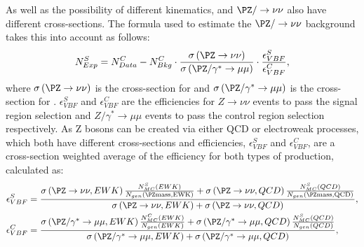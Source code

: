 As well as the possibility of different kinematics, \Zmumu and $\PZ/\rightarrow\nu\nu$ also have different cross-sections. The formula used to estimate the $\PZ/\rightarrow\nu\nu$ background takes this into account as follows:
\begin{equation}
  \label{eq:zdatabkg}
  N^{S}_{Exp}=N^{C}_{Data}-N^{C}_{Bkg}\cdot\frac{\sigma\left(\PZ\rightarrow\nu\nu\right)}{\sigma\left(\PZ/\gamma^{*}\rightarrow\mu\mu\right)}\cdot\frac{\epsilon^{S}_{VBF}}{\epsilon^{C}_{VBF}},
\end{equation}
where $\sigma\left(\PZ\rightarrow\nu\nu\right)$ is the cross-section for \Znunu and $\sigma\left(\PZ/\gamma^{*}\rightarrow\mu\mu\right)$ is the cross-section for \Zmumu. $\epsilon^{S}_{VBF}$ and $\epsilon^{C}_{VBF}$ are the efficiencies for $Z\rightarrow\nu\nu$ events to pass the signal region selection and $Z/\gamma^{*}\rightarrow\mu\mu$ events to pass the control region selection respectively. As Z bosons can be created via either \ac{QCD} or electroweak processes, which both have different cross-sections and efficiencies, $\epsilon^{S}_{VBF}$ and $\epsilon^{C}_{VBF}$, are a cross-section weighted average of the efficiency for both types of production, calculated as:
\begin{align}
  \label{eq:zdataeffs}
  \epsilon^{S}_{VBF}&=\frac{ \sigma\left(\PZ\rightarrow\nu\nu,EWK\right) \frac{N^{S}_{MC}\left(EWK\right)} {N_{gen}\left(\PZ \rm{mass},EWK\right)} + \sigma\left(\PZ\rightarrow\nu\nu,QCD\right) \frac{N^{S}_{MC}\left(QCD\right)} {N_{gen}\left(\PZ \rm{mass},QCD\right)} } {\sigma\left(\PZ\rightarrow\nu\nu,EWK\right) + \sigma\left(\PZ\rightarrow\nu\nu,QCD\right)},\\
  \label{eq:zdataeffc}
  \epsilon^{C}_{VBF}&=\frac{  \sigma\left(\PZ/\gamma^{*}\rightarrow\mu\mu,EWK\right) \frac{N^{C}_{MC}\left(EWK\right)} {N_{gen}\left(EWK\right)} + \sigma\left(\PZ/\gamma^{*}\rightarrow\mu\mu,QCD\right) \frac{N^{S}_{MC}\left(QCD\right)} {N_{gen}\left(QCD\right)}  }{\sigma\left(\PZ/\gamma^{*}\rightarrow\mu\mu,EWK\right)+\sigma\left(\PZ/\gamma^{*}\rightarrow\mu\mu,QCD\right)},
\end{align}
